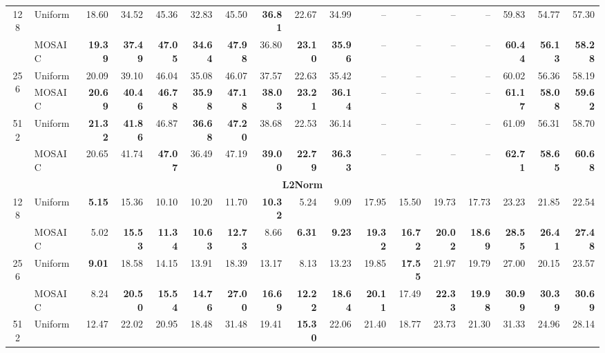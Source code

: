\begin{table}[tp]
\begin{tabular}{@{} c l rrrr rrrr rrrr rrr @{}}
    \midrule
    \multirow{2}{*}{128} & Uniform & 18.60 & 34.52 & 45.36 & 32.83 & 45.50 & \textbf{36.81} & 22.67 & 34.99 & -- & -- & -- & -- & 59.83 & 54.77 & 57.30 \\
     & MOSAIC & \textbf{19.39} & \textbf{37.49} & \textbf{47.05} & \textbf{34.64} & \textbf{47.98} & 36.80 & \textbf{23.10} & \textbf{35.96} & -- & -- & -- & -- & \textbf{60.44} & \textbf{56.13} & \textbf{58.28} \\
    \cmidrule(l){1-17}
    \multirow{2}{*}{256} & Uniform & 20.09 & 39.10 & 46.04 & 35.08 & 46.07 & 37.57 & 22.63 & 35.42 & -- & -- & -- & -- & 60.02 & 56.36 & 58.19 \\
     & MOSAIC & \textbf{20.69} & \textbf{40.46} & \textbf{46.78} & \textbf{35.98} & \textbf{47.18} & \textbf{38.03} & \textbf{23.21} & \textbf{36.14} & -- & -- & -- & -- & \textbf{61.17} & \textbf{58.08} & \textbf{59.62} \\
    \cmidrule(l){1-17}
    \multirow{2}{*}{512} & Uniform & \textbf{21.32} & \textbf{41.86} & 46.87 & \textbf{36.68} & \textbf{47.20} & 38.68 & 22.53 & 36.14 & -- & -- & -- & -- & 61.09 & 56.31 & 58.70 \\
     & MOSAIC & 20.65 & 41.74 & \textbf{47.07} & 36.49 & 47.19 & \textbf{39.00} & \textbf{22.79} & \textbf{36.33} & -- & -- & -- & -- & \textbf{62.71} & \textbf{58.65} & \textbf{60.68} \\
    \midrule
    \multicolumn{17}{c}{\textbf{L2Norm}} \\
    \midrule
    \multirow{2}{*}{128} & Uniform & \textbf{5.15} & 15.36 & 10.10 & 10.20 & 11.70 & \textbf{10.32} & 5.24 & 9.09 & 17.95 & 15.50 & 19.73 & 17.73 & 23.23 & 21.85 & 22.54 \\
     & MOSAIC & 5.02 & \textbf{15.53} & \textbf{11.34} & \textbf{10.63} & \textbf{12.73} & 8.66 & \textbf{6.31} & \textbf{9.23} & \textbf{19.32} & \textbf{16.72} & \textbf{20.02} & \textbf{18.69} & \textbf{28.55} & \textbf{26.41} & \textbf{27.48} \\
    \cmidrule(l){1-17}
    \multirow{2}{*}{256} & Uniform & \textbf{9.01} & 18.58 & 14.15 & 13.91 & 18.39 & 13.17 & 8.13 & 13.23 & 19.85 & \textbf{17.55} & 21.97 & 19.79 & 27.00 & 20.15 & 23.57 \\
     & MOSAIC & 8.24 & \textbf{20.50} & \textbf{15.54} & \textbf{14.76} & \textbf{27.00} & \textbf{16.69} & \textbf{12.22} & \textbf{18.64} & \textbf{20.11} & 17.49 & \textbf{22.33} & \textbf{19.98} & \textbf{30.99} & \textbf{30.39} & \textbf{30.69} \\
    \cmidrule(l){1-17}
    \multirow{2}{*}{512} & Uniform & 12.47 & 22.02 & 20.95 & 18.48 & 31.48 & 19.41 & \textbf{15.30} & 22.06 & 21.40 & 18.77 & 23.73 & 21.30 & 31.33 & 24.96 & 28.14 \\

\end{tabular}
\end{table}
